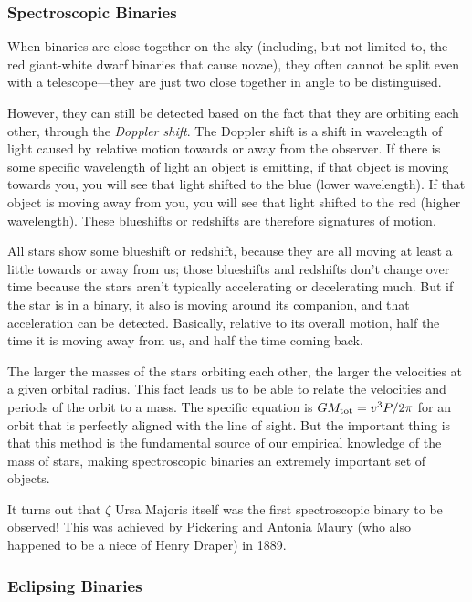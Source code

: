 \documentclass[12pt, preprint]{aastex}
\begin{document}
\subsubsection{Spectroscopic Binaries}

When binaries are close together on the sky (including, but not
limited to, the red giant-white dwarf binaries that cause novae), they
often cannot be split even with a telescope---they are just two close
together in angle to be distinguised. 

However, they can still be detected based on the fact that they are
orbiting each other, through the {\it Doppler shift}.  The Doppler
shift is a shift in wavelength of light caused by relative motion
towards or away from the observer. If there is some specific
wavelength of light an object is emitting, if that object is moving
towards you, you will see that light shifted to the blue (lower
wavelength). If that object is moving away from you, you will see that
light shifted to the red (higher wavelength). These blueshifts or
redshifts are therefore signatures of motion.

All stars show some blueshift or redshift, because they are all moving
at least a little towards or away from us; those blueshifts and
redshifts don't change over time because the stars aren't typically
accelerating or decelerating much. But if the star is in a binary, it
also is moving around its companion, and that acceleration can be
detected. Basically, relative to its overall motion, half the time it
is moving away from us, and half the time coming back.

The larger the masses of the stars orbiting each other, the larger the
velocities at a given orbital radius. This fact leads us to be able to
relate the velocities and periods of the orbit to a mass. The specific
equation is $GM_{\rm tot} = v^3P / 2\pi$ for an orbit that is
perfectly aligned with the line of sight. But the important thing is
that this method is the fundamental source of our empirical knowledge
of the mass of stars, making spectroscopic binaries an extremely
important set of objects.

It turns out that $\zeta$ Ursa Majoris itself was the first
spectroscopic binary to be observed!  This was achieved by Pickering
and Antonia Maury (who also happened to be a niece of Henry Draper) in
1889.

\subsubsection{Eclipsing Binaries}
\end{document}
